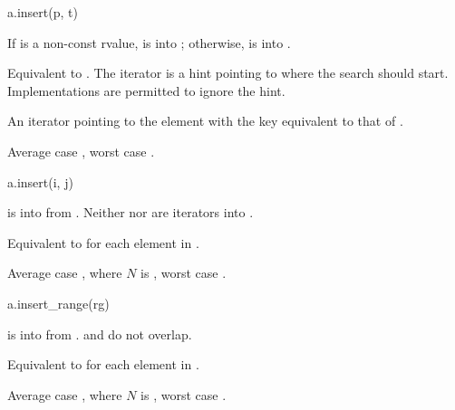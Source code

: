 %
\begin{itemdecl}
a.insert(p, t)
\end{itemdecl}

\begin{itemdescr}
\pnum
\result
{}

\pnum
\expects
If  is a non-const rvalue,
 is  into ;
otherwise,  is  into .

\pnum
\effects
Equivalent to .
The iterator  is a hint pointing to where the search should start.
Implementations are permitted to ignore the hint.

\pnum
\returns
An iterator pointing to
the element with the key equivalent to that of .

\pnum
\complexity
Average case , worst case .
\end{itemdescr}

%
\begin{itemdecl}
a.insert(i, j)
\end{itemdecl}

\begin{itemdescr}
\pnum
\result
{}

\pnum
\expects
{} is
 into  from .
Neither  nor  are iterators into .

\pnum
\effects
Equivalent to  for each element in \tcode{[i,j)}.

\pnum
\complexity
Average case , where $N$ is ,
worst case .
\end{itemdescr}

%
\begin{itemdecl}
a.insert_range(rg)
\end{itemdecl}

\begin{itemdescr}
\pnum
\result
{}

\pnum
\expects
{} is
 into 
from .
 and  do not overlap.

\pnum
\effects
Equivalent to  for each element  in .

\pnum
\complexity
Average case , where $N$ is ,
worst case .
\end{itemdescr}

